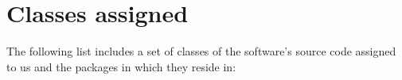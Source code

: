\break
\section{Classes assigned}
The following list includes a set of classes of the software's source code assigned to us and the packages in which they reside in:

